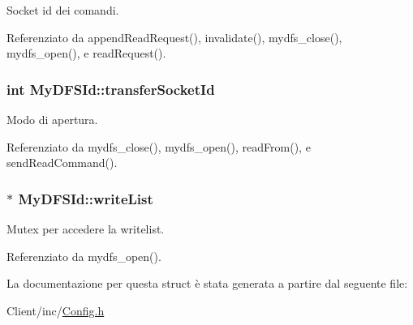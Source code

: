 Socket id dei comandi. 



Referenziato da append\+Read\+Request(), invalidate(), mydfs\+\_\+close(), mydfs\+\_\+open(), e read\+Request().

\subsubsection[{\texorpdfstring{transfer\+Socket\+Id}{transferSocketId}}]{\setlength{\rightskip}{0pt plus 5cm}int My\+D\+F\+S\+Id\+::transfer\+Socket\+Id}\hypertarget{structMyDFSId_a8d5f597502e29e2edc6d2f46c2323b1d}{}\label{structMyDFSId_a8d5f597502e29e2edc6d2f46c2323b1d}


Modo di apertura. 



Referenziato da mydfs\+\_\+close(), mydfs\+\_\+open(), read\+From(), e send\+Read\+Command().

\subsubsection[{\texorpdfstring{write\+List}{writeList}}]{$\ast$ My\+D\+F\+S\+Id\+::write\+List}\hypertarget{structMyDFSId_a0f7d2a9c60ddc649ee7e65b8b9295432}{}\label{structMyDFSId_a0f7d2a9c60ddc649ee7e65b8b9295432}


Mutex per accedere la writelist. 



Referenziato da mydfs\+\_\+open().



La documentazione per questa struct è stata generata a partire dal seguente file\+:\begin{DoxyCompactItemize}
\item 
Client/inc/\hyperlink{Client_2inc_2Config_8h}{Config.\+h}\end{DoxyCompactItemize}
